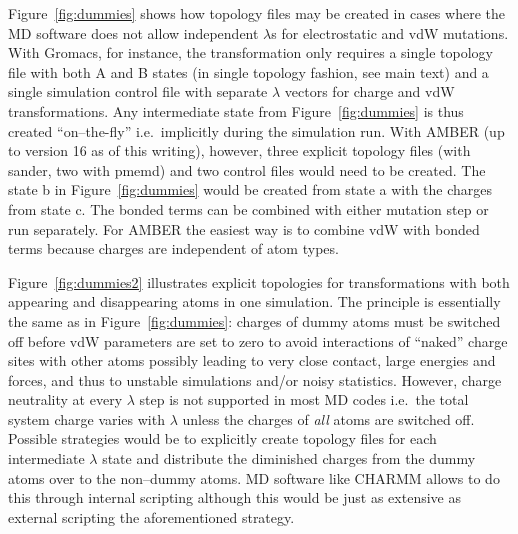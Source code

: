\documentclass[journal=jctcce,manuscript=suppinfo]{achemso}
\begin{document}
Figure~\ref{fig:dummies} shows how topology files may be created in
cases where the MD software does not allow independent $\lambda$s
for electrostatic and vdW mutations.  With Gromacs, for instance, the
transformation only requires a single topology file with both A and B
states (in single topology fashion, see main text) and a single
simulation control file with separate $\lambda$ vectors for charge and
vdW transformations.  Any intermediate state from
Figure~\ref{fig:dummies} is thus created ``on--the-fly'' i.e.\
implicitly during the simulation run.  With AMBER (up to version 16 as
of this writing), however, three explicit topology files (with sander,
two with pmemd) and two control files would need to be created.  The
state b in Figure~\ref{fig:dummies} would be created from state a with
the charges from state c.  The bonded terms can be combined with
either mutation step or run separately.  For AMBER the easiest way is to
combine vdW with bonded terms because charges are independent of atom
types.

Figure~\ref{fig:dummies2} illustrates explicit topologies for
transformations with both appearing and disappearing atoms in one simulation.  
The principle is essentially the same as in Figure~\ref{fig:dummies}:
charges of dummy atoms must be switched off before vdW parameters are
set to zero to avoid interactions of ``naked'' charge sites with other
atoms possibly leading to very close contact, large energies and
forces, and thus to unstable simulations and/or noisy statistics.
However, charge neutrality at every $\lambda$ step is not supported in
most MD codes i.e.\ the total system charge varies with $\lambda$
unless the charges of \emph{all} atoms are switched off.  Possible
strategies would be to explicitly create topology files for each
intermediate $\lambda$ state and distribute the diminished charges from
the dummy atoms over to the non--dummy atoms.  MD software like CHARMM
allows to do this through internal scripting although this would be just as
extensive as external scripting the aforementioned strategy.
\end{document}

